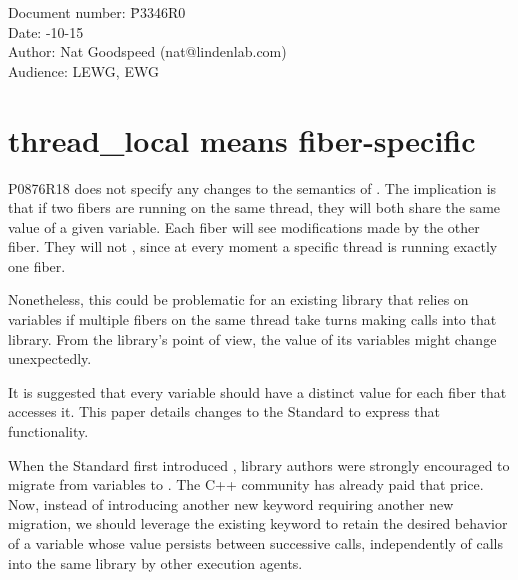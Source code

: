 \documentclass[fontsize=10pt,paper=A4,pagesize,DIV=15]{scrartcl}
\begin{document}
\small
\begin{tabbing}
    Document number: \= P3346R0\\
    Date:            -10-15\\
    Author:          \> Nat Goodspeed (nat@lindenlab.com)\\
    Audience:        \> LEWG, EWG\\
\end{tabbing}

\section*{thread\_local means fiber-specific}


\tableofcontents


\label{abstract}

P0876R18\cite{P0876R18} does not specify any changes to the semantics of
. The implication is that
if two fibers are running on the same thread, they will both share the same
value of a given \tlocal variable. Each fiber will see modifications made by
the other fiber. They will not , since at every
moment a specific thread is running exactly one fiber.

Nonetheless, this could be problematic for an existing library that relies on
\tlocal variables if multiple fibers on the same thread take turns making
calls into that library. From the library's point of view, the value of its
\tlocal variables might change unexpectedly.

It is suggested that every \tlocal variable should have a distinct value for
each fiber that accesses it. This paper details changes to the
Standard\cite{Standard} to express that functionality. 

When the Standard first introduced \tlocal, library authors were strongly
encouraged to migrate from  variables to \tlocal. The C++
community has already paid that price. Now, instead of introducing another new
keyword requiring another new migration, we should leverage the existing
keyword to retain the desired behavior of a variable whose value persists
between successive calls, independently of calls into the same library by
other execution agents.
\end{document}
